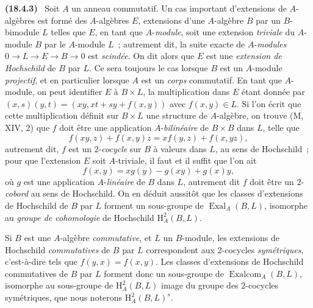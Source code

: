 \documentclass[10pt,oneside]{book}
\makeatletter
\newcommand{\setmanualcurrentlabel}[1]{\def\@currentlabel{#1}}
\newenvironment{env}[1][]{\setmanualcurrentlabel{#1}\par\medskip\noindent\textbf{(#1)}\ }{\par}
\makeatother
\begin{document}
\begin{env}[18.4.3]
\label{0.18.4.3-fr}
Soit $A$ un anneau commutatif. Un cas important d'extensions de
$A$-algèbres est formé des $A$-algèbres $E$, extensions d'une $A$-algèbre $B$
par un $B$-bimodule $L$ telles que $E$, en tant que $A$-\emph{module}, soit une
extension \emph{triviale} du $A$-module $B$ par le $A$-module $L$~; autrement
dit, la suite exacte de $A$-\emph{modules}
$0\to L\to E\to B\to0$ est \emph{scindée}. On dit alors que $E$ est une
\emph{extension de Hochschild} de $B$ par $L$. Ce sera toujours le cas lorsque
$B$ est un $A$-module \emph{projectif}, et en particulier lorsque $A$ est un
\emph{corps} commutatif. En tant que $A$-module, on peut identifier $E$ à
$B\times L$, la multiplication dans $E$ étant donnée par
$(x,s)(y,t)=(xy,xt+sy+f(x,y))$ avec $f(x,y)\in L$. Si l'on écrit que cette
multiplication définit sur $B\times L$ une structure de $A$-algèbre, on trouve
(M, XIV, 2) que $f$ doit être une application $A$-\emph{bilinéaire} de
$B\times B$ dans $L$, telle que
\begin{equation}
\label{0.18.4.3.1-fr}
\tag{18.4.3.1}
  f(xy,z)+f(x,y)z=xf(y,z)+f(x,yz),
\end{equation}
autrement dit, $f$ est un $2$-\emph{cocycle} sur $B$ à valeurs dans $L$, au
sens de Hochschild~; pour que l'extension $E$ soit $A$-triviale, il faut et il
suffit que l'on ait
\begin{equation}
\label{0.18.4.3.2-fr}
\tag{18.4.3.2}
  f(x,y)=xg(y)-g(xy)+g(x)y,
\end{equation}
où $g$ est une application $A$-\emph{linéaire} de $B$ dans $L$, autrement dit
$f$ doit être un $2$-\emph{cobord} au sens de Hochschild. On en déduit aussitôt
que les classes d'extensions de Hochschild de $B$ par $L$ forment un
sous-groupe de $\operatorname{Exal}_A(B,L)$, isomorphe au \emph{groupe de
cohomologie} de Hochschild $\mathrm H_A^2(B,L)$.

Si $B$ est une $A$-algèbre \emph{commutative}, et $L$ un $B$-module, les
extensions de Hochschild \emph{commutatives} de $B$ par $L$ correspondent aux
$2$-cocycles \emph{symétriques}, c'est-à-dire tels que $f(y,x)=f(x,y)$. Les
classes d'extensions de Hochschild commutatives de $B$ par $L$ forment donc un
sous-groupe de $\operatorname{Exalcom}_A(B,L)$, isomorphe au sous-groupe de
$\mathrm H_A^2(B,L)$ image du groupe des $2$-cocycles symétriques, que nous
noterons $\mathrm H_A^2(B,L)^s$.
\end{env}
\end{document}
